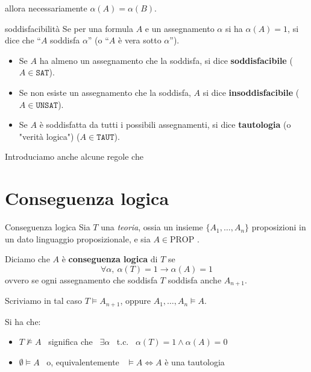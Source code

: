 \documentclass[a4paper,11pt]{report}
\begin{document}
        allora necessariamente \( \alpha(A) = \alpha(B) \).

        \begin{gbox}[colframe=PineGreen]{soddisfacibilità}
            Se per una formula \( A \) e un assegnamento \( \alpha \) si ha \( \alpha (A) = 1 \), si dice che ``\(A \) soddisfa \( \alpha \)'' (o ``\( A \) è vera sotto \( \alpha \)'').
            \begin{itemize}
                \item Se \( A \) ha almeno un assegnamento che la soddisfa, si dice \textbf{soddisfacibile} (\( A \in \texttt{SAT} \)).
                \item Se non esiste un assegnamento che la soddisfa, \( A \) si dice \textbf{insoddisfacibile} (\( A \in \texttt{UNSAT} \)).
                \item Se \( A \) è soddisfatta da tutti i possibili assegnamenti, si dice \textbf{tautologia} (o "verità logica") (\( A \in \texttt{TAUT} \)).
            \end{itemize}
        \end{gbox}

        Introduciamo anche alcune regole che 

        \section{Conseguenza logica}

        \begin{defbox}{Conseguenza logica}{}
            Sia \( T \) una \textit{teoria}, ossia un insieme  \( \{A_1, \dots, A_n\} \) proposizioni in un dato linguaggio proposizionale, e sia \( A \in \text{PROP}\) .

            Diciamo che \( A \) è \textbf{conseguenza logica} di \( T\) se 
            \[ \forall \alpha,\ \alpha(T)=1 \to \alpha(A)=1 \] 
            ovvero se ogni assegnamento che soddisfa \(T\) soddisfa anche \( A_{n+1} \).

            Scriviamo in tal caso \(  T \vDash A_{n+1} \), oppure \( A_1, \dots, A_n \vDash A \).
        \end{defbox}

        Si ha che:
        \begin{itemize}
            \item \(T \not\vDash A\) \ significa che \ \( \exists \alpha \) \ t.c. \ \( \alpha(T) = 1 \land \alpha(A) = 0 \)
            \item \( \emptyset \vDash A \) \ o, equivalentemente \ \( \vDash A \iff A\) è una tautologia
        \end{itemize}
\end{document}
